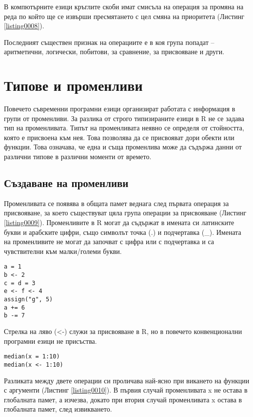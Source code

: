 В компютърните езици кръглите скоби имат смисъла на операция за промяна на реда по който ще се извърши пресмятането с цел смяна на приоритета (Листинг \ref{listing0008}).

Последният съществен признак на операциите е в коя група попадат – аритметични, логически, побитови, за сравнение, за присвояване и други.

\section{Типове и променливи}

Повечето съвременни програмни езици организират работата с информация в групи от променливи. За разлика от строго типизираните езици в R не се задава тип на променливата. Типът на променливата неявно се определя от стойността, която е присвоена към нея. Това позволява да се присвояват дори обекти или функции. Това означава, че една и съща променлива може да съдържа данни от различни типове в различни моменти от времето. 

\subsection{Създаване на променливи}

Променливата се появява в общата памет веднага след първата операция за присвояване, за което съществуват цяла група операции за присвояване (Листинг \ref{listing0009}). Променливите в R могат да съдържат в имената си латинските букви и арабските цифри, също символът точка (.) и подчертавка (\_). Имената на променливите не могат да започват с цифра или с подчертавка и са чувствителни към малки/големи букви. 

\begin{lstlisting}[caption=Операции за присвояване, label=listing0009]
a = 1
b <- 2
c = d = 3
e <- f <- 4
assign("g", 5)
a += 6
b -= 7
\end{lstlisting}

Стрелка на ляво (<-) служи за присвояване в R, но в повечето конвенционални програмни езици не присъства. 

\begin{lstlisting}[caption=Алтернативи за операцията присвояване, label=listing0010]
median(x = 1:10)
median(x <- 1:10)
\end{lstlisting}

Разликата между двете операции си проличава най-ясно при викането на функции с аргументи (Листинг \ref{listing0010}). В първия случай променливата x не остава в глобалната памет, а изчезва, докато при втория случай променливата x остава в глобалната памет, след извикването. 


